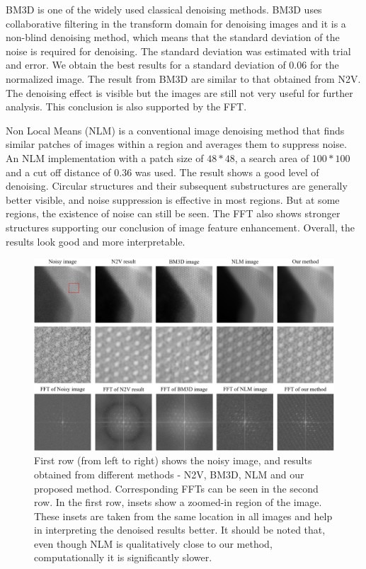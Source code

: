 \documentclass[fleqn,10pt]{wlscirep}
\begin{document}
	BM3D \cite{DBLP:journals/tip/BM3D} is one of the widely used classical denoising methods. BM3D uses collaborative filtering in the transform domain for denoising images and it is a non-blind denoising method, which means that the standard deviation of the noise is required for denoising. The standard deviation was estimated with trial and error. We obtain the best results for a standard deviation of 0.06 for the normalized image. The result from BM3D are similar to that obtained from N2V. The denoising effect is visible but the images are still not very useful for further analysis. This conclusion is also supported by the FFT.
	
		
	Non Local Means (NLM) \cite{bcm_nlm} is a conventional image denoising method that finds similar patches of images within a region and averages them to suppress noise. An NLM implementation with a patch size of $48*48$, a search area of $100*100$ and a cut off distance of 0.36 was used. The result shows a good level of denoising. Circular structures and their subsequent substructures are generally better visible, and noise suppression is effective in most regions. But at some regions, the existence of noise can still be seen. The FFT also shows stronger structures supporting our conclusion of image feature enhancement. Overall, the results look good and more interpretable. 
	
	\begin{figure}[H]
		\centering
		\includegraphics[scale=0.4]{./imgs/comparison-zoomed.jpg}
		\caption{First row (from left to right) shows the noisy image, and results obtained from different methods - N2V, BM3D, NLM and our proposed method. Corresponding FFTs can be seen in the second row. In the first row, insets show a zoomed-in region of the image. These insets are taken from the same location in all images and help in interpreting the denoised results better. It should be noted that, even though NLM is qualitatively close to our method, computationally it is significantly slower. }
		\label{fig:comparison}
	\end{figure}
		
\end{document}
